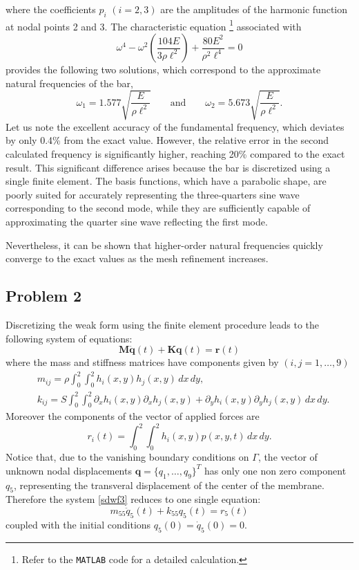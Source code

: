 \documentclass[12pt]{article}
\begin{document}
where the coefficients $p_i$ $(i=2,3)$ are the amplitudes of the harmonic function at nodal points 2 and 3. The characteristic equation \footnote{Refer to the \texttt{MATLAB} code for a detailed calculation.} associated with
\begin{equation*}
    \omega^4 - \omega^2 \left( \frac{104E}{3\rho \ell^2} \right) + \frac{80E^2}{\rho^2 \ell^4} = 0
\end{equation*}
provides the following two solutions, which correspond to the approximate natural frequencies of the bar,
$$ \omega_1 = 1.577 \sqrt{\frac{E}{\rho \ell^2}} \qquad\text{and}\qquad \omega_2 = 5.673 \sqrt{\frac{E}{\rho \ell^2}}.$$
Let us note the excellent accuracy of the fundamental frequency, which deviates by only 0.4\% from the exact value. However, the relative error in the second calculated frequency is significantly higher, reaching 20\% compared to the exact result. This significant difference arises because the bar is discretized using a single finite element. The basis functions, which have a parabolic shape, are poorly suited for accurately representing the three-quarters sine wave corresponding to the second mode, while they are sufficiently capable of approximating the quarter sine wave reflecting the first mode.

Nevertheless, it can be shown that higher-order natural frequencies quickly converge to the exact values as the mesh refinement increases.

\subsection*{Problem 2}

Discretizing the weak form using the finite element procedure leads to the following system of equations:
\begin{equation}
    \label{sdwf3}
    \mathbf M\ddot{\mathbf q}(t)+\mathbf K\mathbf q(t)=\mathbf r(t)
\end{equation}
where the mass and stiffness matrices have components given by $(i, j=1,\dots, 9) $
\begin{equation*}
    \begin{aligned}
         & m_{i j}=\rho\int_0^{2}\int_0^{2} h_i(x,y) h_j(x,y) \, dx\, dy                             ,                                         \\
         & k_{i j}=S\int_0^{2}\int_0^{2} \partial_{x}h_{i}(x,y)\partial_{x}h_{j}(x,y)+\partial_{y}h_{i}(x,y)\partial_{y}h_{j}(x,y)\,  dx\, dy.
    \end{aligned}
\end{equation*}
Moreover the components of the vector of applied forces are
$$r_i(t)=\int_0^{2}\int_0^{2} h_i(x,y)p(x,y,t)\, dx\, dy.$$
Notice that, due to the vanishing boundary conditions on $\Gamma$, the vector of unknown nodal displacements $\mathbf{q}=\{q_1,\dots,q_9\}^T$ has only one non zero component $q_5$, representing the transveral displacement of the center of the membrane. Therefore the system \eqref{sdwf3} reduces to one single equation:
$$m_{55}\ddot{q}_5(t)+k_{55} q_5(t)= r_5(t)$$
coupled with the initial conditions $q_5(0)=\dot q_5(0)=0$.
\end{document}
